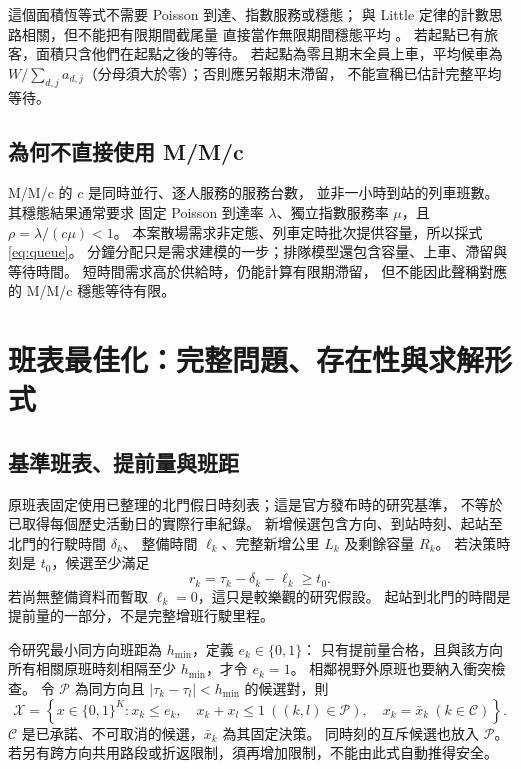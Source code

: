 這個面積恆等式不需要 Poisson 到達、指數服務或穩態；
與 Little 定律的計數思路相關，但不能把有限期間截尾量
直接當作無限期間穩態平均 \cite{little,urban}。
若起點已有旅客，面積只含他們在起點之後的等待。
若起點為零且期末全員上車，平均候車為
$W/\sum_{d,j}a_{d,j}$（分母須大於零）；否則應另報期末滯留，
不能宣稱已估計完整平均等待。

\subsection{為何不直接使用 M/M/c}
M/M/c 的 $c$ 是同時並行、逐人服務的服務台數，
並非一小時到站的列車班數。其穩態結果通常要求
固定 Poisson 到達率 $\lambda$、獨立指數服務率 $\mu$，且
$\rho=\lambda/(c\mu)<1$。
本案散場需求非定態、列車定時批次提供容量，所以採式 \eqref{eq:queue}。
分鐘分配只是需求建模的一步；排隊模型還包含容量、上車、滯留與等待時間。
短時間需求高於供給時，仍能計算有限期滯留，
但不能因此聲稱對應的 M/M/c 穩態等待有限。

\section{班表最佳化：完整問題、存在性與求解形式}

\subsection{基準班表、提前量與班距}
原班表固定使用已整理的北門假日時刻表；這是官方發布時的研究基準，
不等於已取得每個歷史活動日的實際行車紀錄。
新增候選包含方向、到站時刻、起站至北門的行駛時間 $\delta_k$、
整備時間 $\ell_k$、完整新增公里 $L_k$ 及剩餘容量 $R_k$。
若決策時刻是 $t_0$，候選至少滿足
\begin{equation}
r_k=\tau_k-\delta_k-\ell_k\ge t_0.
\end{equation}
若尚無整備資料而暫取 $\ell_k=0$，這只是較樂觀的研究假設。
起站到北門的時間是提前量的一部分，不是完整增班行駛里程。

令研究最小同方向班距為 $h_{\min}$，定義 $e_k\in\{0,1\}$：
只有提前量合格，且與該方向所有相關原班時刻相隔至少 $h_{\min}$，才令 $e_k=1$。
相鄰視野外原班也要納入衝突檢查。
令 $\mathcal P$ 為同方向且 $|\tau_k-\tau_l|<h_{\min}$ 的候選對，則
\begin{equation}
\mathcal X=\left\{x\in\{0,1\}^{K}:
x_k\le e_k,\quad x_k+x_l\le1\ ((k,l)\in\mathcal P),\quad
x_k=\bar x_k\ (k\in\mathcal C)\right\}.
\label{eq:feasible}
\end{equation}
$\mathcal C$ 是已承諾、不可取消的候選，$\bar x_k$ 為其固定決策。
同時刻的互斥候選也放入 $\mathcal P$。
若另有跨方向共用路段或折返限制，須再增加限制，不能由此式自動推得安全。

